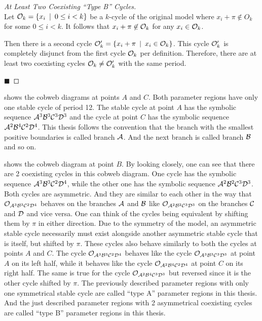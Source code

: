 \begin{proof}[At Least Two Coexisting ``Type B'' Cycles] \phantom{x} \\
	Let $\mathcal{O}_k = \left\{x_i \:\mid\: 0 \leq i < k\right\}$ be a $k$-cycle of the original model where $x_i + \pi \not\in O_k$ for some $0 \leq i < k$.
	It follows that $x_i + \pi \not\in \mathcal{O}_k$ for any $x_i \in \mathcal{O}_k$.

	Then there is a second cycle $\mathcal{O}'_k = \left\{x_i + \pi \:\mid\: x_i \in \mathcal{O}_k\right\}$.
	This cycle $\mathcal{O}'_k$ is completely disjunct from the first cycle $\mathcal{O}_k$ per definition.
	Therefore, there are at least two coexisting cycles $\mathcal{O}_k \neq \mathcal{O}'_k$ with the same period.

	\hfill	$\blacksquare$
\end{proof}

 shows the cobweb diagrams at points $A$ and $C$.
Both parameter regions have only one stable cycle of period 12.
The stable cycle at point $A$ has the symbolic sequence $\mathcal{A}^3\mathcal{B}^3\mathcal{C}^3\mathcal{D}^3$ and the cycle at point $C$ has the symbolic sequence $\mathcal{A}^2\mathcal{B}^4\mathcal{C}^2\mathcal{D}^4$.
This thesis follows the convention that the branch with the smallest positive boundaries is called branch $\mathcal{A}$.
And the next branch is called branch $\mathcal{B}$ and so on.

 shows the cobweb diagram at point $B$.
By looking closely, one can see that there are 2 coexisting cycles in this cobweb diagram.
One cycle has the symbolic sequence $\mathcal{A}^3\mathcal{B}^3\mathcal{C}^2\mathcal{D}^4$, while the other one has the symbolic sequence $\mathcal{A}^2\mathcal{B}^2\mathcal{C}^3\mathcal{D}^3$.
Both cycles are asymmetric.
And they are similar to each other in the way that $\mathcal{O}_{\mathcal{A}^3\mathcal{B}^3\mathcal{C}^2\mathcal{D}^4}$ behaves on the branches $\mathcal{A}$ and $\mathcal{B}$ like $\mathcal{O}_{\mathcal{A}^2\mathcal{B}^2\mathcal{C}^3\mathcal{D}^3}$ on the branches $\mathcal{C}$ and $\mathcal{D}$ and vice versa.
One can think of the cycles being equivalent by shifting them by $\pi$ in either direction.
Due to the symmetry of the model, an asymmetric stable cycle necessarily must exist alongside another asymmetric stable cycle that is itself, but shifted by $\pi$.
These cycles also behave similarly to both the cycles at points $A$ and $C$.
The cycle $\mathcal{O}_{\mathcal{A}^3\mathcal{B}^3\mathcal{C}^2\mathcal{D}^4}$ behaves like the cycle $\mathcal{O}_{\mathcal{A}^3\mathcal{B}^3\mathcal{C}^3\mathcal{D}^3}$ at point $A$ on its left half, while it behaves like the cycle $\mathcal{O}_{\mathcal{A}^2\mathcal{B}^4\mathcal{C}^2\mathcal{D}^4}$ at point $C$ on its right half.
The same is true for the cycle $\mathcal{O}_{\mathcal{A}^2\mathcal{B}^4\mathcal{C}^3\mathcal{D}^3}$ but reversed since it is the other cycle shifted by $\pi$.
The previously described parameter regions with only one symmetrical stable cycle are called ``type A'' parameter regions in this thesis.
And the just described parameter regions with 2 asymmetrical coexisting cycles are called ``type B'' parameter regions in this thesis.

